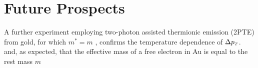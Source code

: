 \section{Future Prospects} \label{sec:photocathode_future}

A further experiment employing two-photon assisted thermionic emission (2PTE) from gold, for which $m^* = m$ \cite{johnson_optical_1972}, confirms the temperature dependence of $\Delta p_{{\scriptscriptstyle T}}$.
 and, as expected, that the effective mass of a free electron in Au is equal to the rest mass $m$ \cite{johnson_optical_1972}
